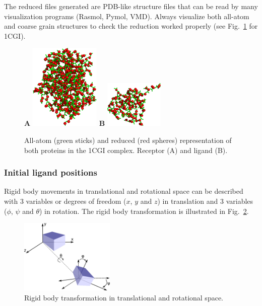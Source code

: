 \documentclass[12pt,a4paper]{article}
\begin{document}
The reduced files generated are PDB-like structure files that can be read by many visualization programs (Rasmol, Pymol, VMD). Always visualize both all-atom and coarse grain structures to check the reduction worked properly (see Fig.~\ref{1CGI_at_cg} for 1CGI).

\begin{figure}[htbp]
\center
{\textbf A}
\includegraphics*[width=0.30\textwidth]{img/1CGI_receptor.png}
\hspace*{2cm}
{\textbf B}
\includegraphics*[width=0.25\textwidth]{img/1CGI_ligand.png}
\caption{All-atom (green sticks) and reduced (red spheres) representation of 
both proteins in the 1CGI complex. Receptor (A) and ligand (B).}
\label{1CGI_at_cg}
\end{figure}

\subsubsection{Initial ligand positions}

Rigid body movements in translational and rotational space can be described
with 3 variables or degrees of freedom ($x$, $y$ and $z$) in translation 
and 3 variables ($\phi$, $\psi$ and $\theta$) in rotation. The rigid body 
transformation is illustrated in Fig.~\ref{rigid_body}.

\begin{figure}[!htbp]
\center
\includegraphics*[width=0.4\textwidth]{img/rigid_body_freedom.png}
\caption{Rigid body transformation in translational and rotational space.}
\label{rigid_body}
\end{figure}
\end{document}
